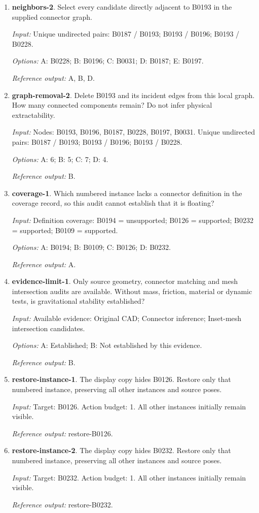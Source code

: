 \begin{enumerate}
\item \textbf{neighbors-2}. Select every candidate directly adjacent to B0193 in the supplied connector graph.\par {\small \textit{Input:} Unique undirected pairs: B0187 / B0193; B0193 / B0196; B0193 / B0228. \par\textit{Options:} A: B0228; B: B0196; C: B0031; D: B0187; E: B0197. \par\textit{Reference output:} A, B, D.}
\item \textbf{graph-removal-2}. Delete B0193 and its incident edges from this local graph. How many connected components remain? Do not infer physical extractability.\par {\small \textit{Input:} Nodes: B0193, B0196, B0187, B0228, B0197, B0031. Unique undirected pairs: B0187 / B0193; B0193 / B0196; B0193 / B0228. \par\textit{Options:} A: 6; B: 5; C: 7; D: 4. \par\textit{Reference output:} B.}
\item \textbf{coverage-1}. Which numbered instance lacks a connector definition in the coverage record, so this audit cannot establish that it is floating?\par {\small \textit{Input:} Definition coverage: B0194 = unsupported; B0126 = supported; B0232 = supported; B0109 = supported. \par\textit{Options:} A: B0194; B: B0109; C: B0126; D: B0232. \par\textit{Reference output:} A.}
\item \textbf{evidence-limit-1}. Only source geometry, connector matching and mesh intersection audits are available. Without mass, friction, material or dynamic tests, is gravitational stability established?\par {\small \textit{Input:} Available evidence: Original CAD; Connector inference; Inset-mesh intersection candidates. \par\textit{Options:} A: Established; B: Not established by this evidence. \par\textit{Reference output:} B.}
\item \textbf{restore-instance-1}. The display copy hides B0126. Restore only that numbered instance, preserving all other instances and source poses.\par {\small \textit{Input:} Target: B0126. Action budget: 1. All other instances initially remain visible. \par\textit{Reference output:} restore-B0126.}
\item \textbf{restore-instance-2}. The display copy hides B0232. Restore only that numbered instance, preserving all other instances and source poses.\par {\small \textit{Input:} Target: B0232. Action budget: 1. All other instances initially remain visible. \par\textit{Reference output:} restore-B0232.}
\end{enumerate}
\clearpage
